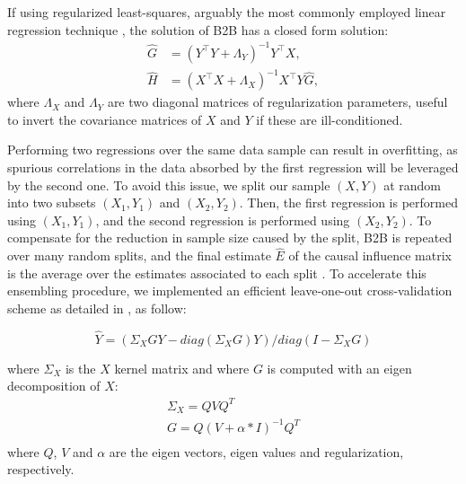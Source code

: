 \documentclass{article}
\begin{document}
If using regularized least-squares, arguably the most commonly employed linear regression technique \citep{hoerl1959optimum, rifkin2007notes}, the solution of B2B has a closed form solution:
\begin{align}
    \hat G &= (Y^\top Y + \Lambda_Y)^{-1} Y^\top X,\label{eq:solG}\\
    \hat H &=(X^\top X + \Lambda_X)^{-1} X^\top Y \hat G,\label{eq:solH}
\end{align}
%
where $\Lambda_X$ and $\Lambda_Y$ are two diagonal matrices of regularization parameters, useful to invert the covariance matrices of $X$ and $Y$ if these are ill-conditioned.

Performing two regressions over the same data sample can result in overfitting, as spurious correlations in the data absorbed by the first regression will be leveraged by the second one.
%
To avoid this issue, we split our sample $(X, Y)$ at random into two subsets $(X_1, Y_1)$ and $(X_2, Y_2)$.
%
Then, the first regression is performed using $(X_1, Y_1)$, and the second regression is performed using $(X_2, Y_2)$.
%
To compensate for the reduction in sample size caused by the split, B2B is repeated over many random splits, and the final estimate $\hat E$ of the causal influence matrix is the average over the estimates associated to each split \citep{efron1992bootstrap}.
%
To accelerate this ensembling procedure, we implemented an efficient leave-one-out cross-validation scheme as detailed in \citep{RifkinLippert2007} %
, as follow:
%

\begin{equation}
\hat{Y} = (\Sigma_X G Y - diag(\Sigma_X G) Y) / diag(I - \Sigma_X G)
\end{equation}

where $\Sigma_X$ is the $X$ kernel matrix and where $G$ is computed with an eigen decomposition of $X$:
\begin{equation}
  \begin{aligned}
  \Sigma_X = Q V Q^T \\
  G = Q (V + \alpha*I)^{-1} Q^T\\
  \end{aligned}
\end{equation}
where $Q$, $V$ and $\alpha$ are the eigen vectors, eigen values and regularization, respectively.

%
\end{document}
